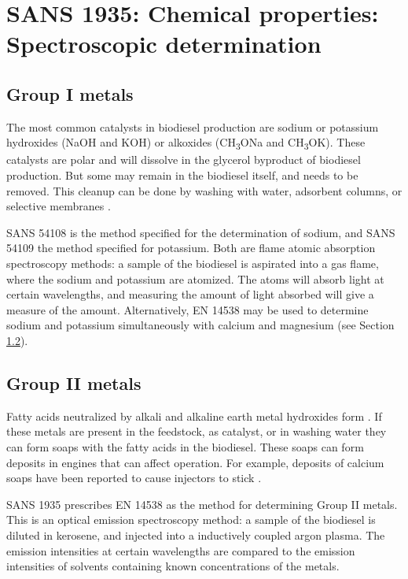 \section{SANS 1935: Chemical properties: Spectroscopic determination}

\subsection{Group I metals}

The most common catalysts in biodiesel production are sodium or potassium
hydroxides (NaOH and KOH) or alkoxides (CH\textsubscript{3}ONa and
CH\textsubscript{3}OK). These catalysts are polar and will dissolve in the
glycerol byproduct of biodiesel production. But some may remain in the biodiesel
itself, and needs to be removed. This cleanup can be done by washing with water,
adsorbent columns, or selective membranes \autocite{Atadashi2011}.

SANS 54108 is the method specified for the determination of sodium, and SANS
54109 the method specified for potassium. Both are flame atomic absorption
spectroscopy methods: a sample of the biodiesel is aspirated into a gas flame,
where the sodium and potassium are atomized. The atoms will absorb light at
certain wavelengths, and measuring the amount of light absorbed will give a
measure of the amount. Alternatively, EN 14538 may be used to determine sodium
and potassium simultaneously with calcium and magnesium (see Section
\ref{sec:GroupIIMetals}).

\subsection{Group II metals}
\label{sec:GroupIIMetals}

Fatty acids neutralized by alkali and alkaline earth metal hydroxides form
. If these metals are present in the feedstock, as catalyst, or
in washing water they can form soaps with the fatty acids in the biodiesel.
These soaps can form deposits in engines that can affect operation. For
example, deposits of calcium soaps have been reported to cause injectors to
stick \autocite{Pischinger2000}.

SANS 1935 prescribes EN 14538 as the method for determining Group II metals.
This is an optical emission spectroscopy method: a sample of the biodiesel is
diluted in kerosene, and injected into a inductively coupled argon plasma. The
emission intensities at certain wavelengths are compared to the emission
intensities of solvents containing known concentrations of the metals.

